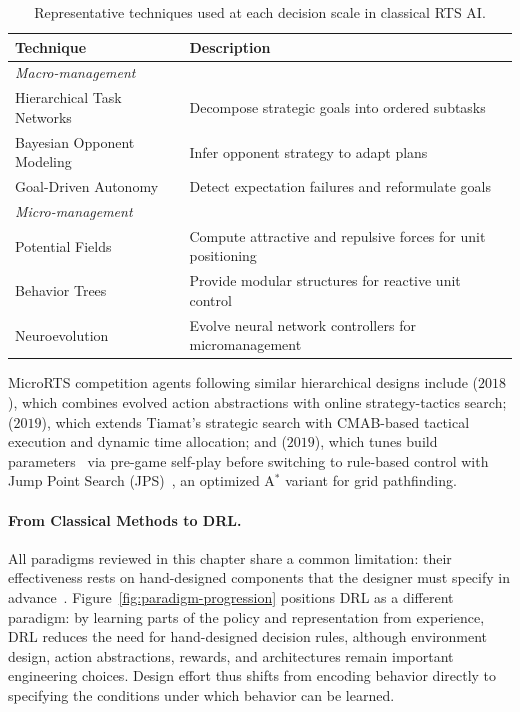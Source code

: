 \begin{table}[!ht]
\centering
\caption[Representative techniques by decision scale in classical RTS AI]{Representative techniques used at each decision scale in classical RTS AI.}
\label{tab:macro-micro}
\small
\begin{tabularx}{\textwidth}{l X}
\toprule
\textbf{Technique} & \textbf{Description} \\
\midrule
\multicolumn{2}{l}{\textit{Macro-management}} \\
\midrule
Hierarchical Task Networks & Decompose strategic goals into ordered subtasks~\cite{ontanonAHTN2015} \\
Bayesian Opponent Modeling & Infer opponent strategy to adapt plans~\cite{synnaeveBayesianModelPlan2011} \\
Goal-Driven Autonomy & Detect expectation failures and reformulate goals~\cite{weberApplyingGoalDrivenAutonomy2010} \\
\midrule
\multicolumn{2}{l}{\textit{Micro-management}} \\
\midrule
Potential Fields & Compute attractive and repulsive forces for unit positioning~\cite{hagelbackRisePotentialFields2008} \\
Behavior Trees & Provide modular structures for reactive unit control~\cite{robertsonBuildingBehaviorTrees2015} \\
Neuroevolution & Evolve neural network controllers for micromanagement~\cite{gajurelNeuroevolutionRTSMicro2018} \\
\bottomrule
\end{tabularx}
\end{table}

MicroRTS competition agents following similar hierarchical designs include  ($2018$), which combines evolved action abstractions with online strategy-tactics search;  ($2019$), which extends Tiamat's strategic search with CMAB-based tactical execution and dynamic time allocation; and  ($2019$), which tunes build parameters~\cite{churchillBuildOrderOptimization2011} via pre-game self-play before switching to rule-based control with Jump Point Search (JPS)~\cite{haraborOnlineGraphPruning2011}, an optimized A$^*$ variant for grid pathfinding.

\paragraph*{From Classical Methods to DRL.}
All paradigms reviewed in this chapter share a common limitation: their effectiveness rests on hand-designed components that the designer must specify in advance~\cite{ontanonRTSAIProblems2015, adilStateoftheArtOpenChallenges2017}. Figure~\ref{fig:paradigm-progression} positions DRL as a different paradigm: by learning parts of the policy and representation from experience, DRL reduces the need for hand-designed decision rules, although environment design, action abstractions, rewards, and architectures remain important engineering choices. Design effort thus shifts from encoding behavior directly to specifying the conditions under which behavior can be learned.